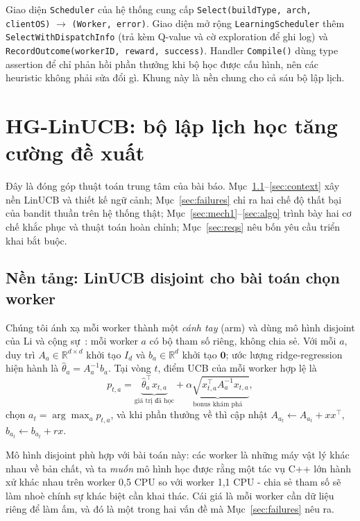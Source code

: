 \documentclass[final,5p,times,twocolumn]{elsarticle}
\begin{document}
Giao diện \texttt{Scheduler} của hệ thống cung cấp \texttt{Select(buildType, arch, clientOS)} $\to$ \texttt{(Worker, error)}. Giao diện mở rộng \texttt{LearningScheduler} thêm \texttt{SelectWithDispatchInfo} (trả kèm Q-value và cờ exploration để ghi log) và \texttt{RecordOutcome(workerID, reward, success)}. Handler \texttt{Compile()} dùng type assertion để chỉ phản hồi phần thưởng khi bộ học được cấu hình, nên các heuristic không phải sửa đổi gì. Khung này là nền chung cho cả sáu bộ lập lịch.

\section{HG-LinUCB: bộ lập lịch học tăng cường đề xuất}
\label{sec:hglinucb}

Đây là đóng góp thuật toán trung tâm của bài báo. Mục~\ref{sec:linucb}--\ref{sec:context} xây nền LinUCB và thiết kế ngữ cảnh; Mục~\ref{sec:failures} chỉ ra hai chế độ thất bại của bandit thuần trên hệ thống thật; Mục~\ref{sec:mech1}--\ref{sec:algo} trình bày hai cơ chế khắc phục và thuật toán hoàn chỉnh; Mục~\ref{sec:reqs} nêu bốn yêu cầu triển khai bắt buộc.

\subsection{Nền tảng: LinUCB disjoint cho bài toán chọn worker}
\label{sec:linucb}

Chúng tôi ánh xạ mỗi worker thành một \emph{cánh tay} (arm) và dùng mô hình disjoint của Li và cộng sự~\cite{li2010}: mỗi worker $a$ có bộ tham số riêng, không chia sẻ. Với mỗi $a$, duy trì $A_a\in\mathbb{R}^{d\times d}$ khởi tạo $I_d$ và $b_a\in\mathbb{R}^d$ khởi tạo $\mathbf{0}$; ước lượng ridge-regression hiện hành là $\hat{\theta}_a=A_a^{-1}b_a$. Tại vòng $t$, điểm UCB của mỗi worker hợp lệ là
\begin{equation}
p_{t,a}=\underbrace{\hat{\theta}_a^\top x_{t,a}}_{\text{giá trị đã học}}+\underbrace{\alpha\sqrt{x_{t,a}^\top A_a^{-1}x_{t,a}}}_{\text{bonus khám phá}},
\end{equation}
chọn $a_t=\arg\max_a p_{t,a}$, và khi phần thưởng về thì cập nhật $A_{a_t}\leftarrow A_{a_t}+xx^\top$, $b_{a_t}\leftarrow b_{a_t}+rx$.

Mô hình disjoint phù hợp với bài toán này: các worker là những máy vật lý khác nhau về bản chất, và ta \emph{muốn} mô hình học được rằng một tác vụ C++ lớn hành xử khác nhau trên worker 0,5 CPU so với worker 1,1 CPU - chia sẻ tham số sẽ làm nhoè chính sự khác biệt cần khai thác. Cái giá là mỗi worker cần dữ liệu riêng để làm ấm, và đó là một trong hai vấn đề mà Mục~\ref{sec:failures} nêu ra.
\end{document}
